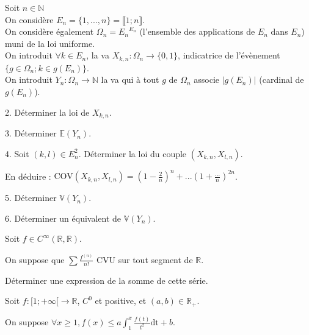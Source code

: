\vspace{5pt}
\noindent Soit $n \in \mathbb{N}$ \\
\noindent On considère $E_n = \{1, ..., n\} = \llbracket 1;n \rrbracket$. \\
\noindent On considère également $\Omega_n = {E_n}^{E_n}$
(l'ensemble des applications de $E_n$ dans $E_n$) muni de la loi uniforme. \\
\noindent On introduit $\forall k \in E_n$, la va $X_{k,n} : \Omega_n \rightarrow \{0,1\}$,
indicatrice de l'évènement $\{g \in \Omega_n; k \in g(E_n)\}$. \\
\noindent On introduit $Y_n : \Omega_n \rightarrow \mathbb{N}$ la va qui à tout $g$ de $\Omega_n$
associe $|g(E_n)|$ (cardinal de $g(E_n)$).

\vspace{5pt}
2. Déterminer la loi de $X_{k,n}$.

\vspace{5pt}
3. Déterminer $\mathbb{E}(Y_n)$.

\vspace{5pt}
4. Soit $(k,l) \in E_n^2$. Déterminer la loi du couple $(X_{k,n}, X_{l,n})$.

En déduire :
$\textrm{COV}(X_{k,n}, X_{l,n}) = \left( 1 - \frac {2} {n}\right) ^n + ... \left(1 + \frac {...} {n}\right)^{2n}$.

\vspace{5pt}
5. Déterminer $\mathbb{V}(Y_n)$.

\vspace{5pt}
6. Déterminer un équivalent de $\mathbb{V}(Y_n)$.



\subetoiles



\noindent Soit $f \in C^{\infty}(\mathbb{R}, \mathbb{R})$.

\noindent On suppose que $\displaystyle \sum \frac {f^{(n)}} {n!}$ CVU sur tout segment de $\mathbb{R}$.

\noindent Déterminer une expression de la somme de cette série.



\subetoiles
\columnbreak



\noindent Soit $f : \lbrack 1; +\infty \lbrack \rightarrow \mathbb{R}$,  $C^0$ et positive, et $(a,b) \in \mathbb{R}_+$.

\vspace{5pt}
\noindent On suppose $\displaystyle \forall x \geqslant 1, f(x) \leqslant a \int_{1}^{x} \frac {f(t)} {t^2} \mathrm{dt} + b$.

